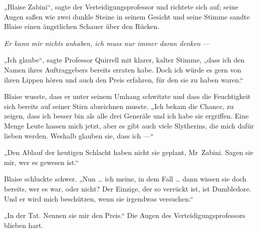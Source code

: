 „Blaise Zabini“, sagte der Verteidigungsprofessor und richtete sich auf; seine Augen saßen wie zwei dunkle Steine in seinem Gesicht und seine Stimme sandte Blaise einen ängstlichen Schauer über den Rücken.

\emph{Er kann mir nichts anhaben, ich muss nur immer daran denken} —

„Ich glaube“, sagte Professor Quirrell mit klarer, kalter Stimme, „dass ich den Namen ihres Auftraggebers bereits erraten habe. Doch ich würde es gern von ihren Lippen hören und auch den Preis erfahren, für den sie zu haben waren.“

Blaise wusste, dass er unter seinem Umhang schwitzte und dass die Feuchtigkeit sich bereits auf seiner Stirn abzeichnen musste.
„Ich bekam die Chance, zu zeigen, dass ich besser bin als alle drei Generäle und ich habe sie ergriffen. Eine Menge Leute hassen mich jetzt, aber es gibt auch viele Slytherins, die mich dafür lieben werden. Weshalb glauben sie, dass ich —“

„Den Ablauf der heutigen Schlacht haben nicht sie geplant, Mr~Zabini. Sagen sie mir, wer es gewesen ist.“

Blaise schluckte schwer.
„Nun … ich meine, in dem Fall … dann wissen sie doch bereits, wer es war, oder nicht? Der Einzige, der so verrückt ist, ist Dumbledore. Und er wird mich beschützen, wenn sie irgendwas versuchen.“

„In der Tat. Nennen sie mir den Preis.“ Die Augen des Verteidigungsprofessors blieben hart.

